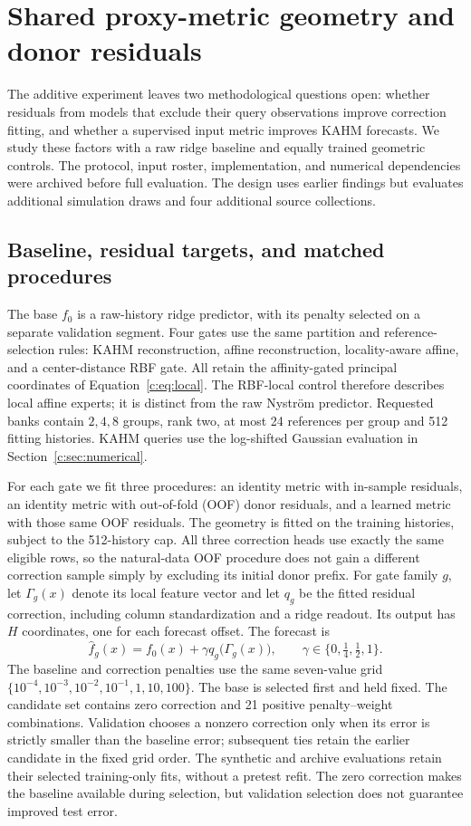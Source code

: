 \section{Shared proxy-metric geometry and donor residuals}
\label{sec:target-geometry}

The additive experiment leaves two methodological questions open: whether
residuals from models that exclude their query observations improve
correction fitting, and whether a supervised input metric improves KAHM
forecasts. We study these factors with a raw ridge baseline and equally
trained geometric controls. The protocol, input roster, implementation,
and numerical dependencies were archived before full evaluation. The
design uses earlier findings but evaluates additional simulation draws
and four additional source collections.

\subsection{Baseline, residual targets, and matched procedures}
\label{sec:target-procedures}

The base $f_0$ is a raw-history ridge predictor, with its penalty selected
on a separate validation segment. Four gates use the same partition and
reference-selection rules: KAHM reconstruction, affine reconstruction,
locality-aware affine, and a center-distance RBF gate. All retain the
affinity-gated principal coordinates of Equation~\eqref{c:eq:local}.
The RBF-local control therefore describes local affine experts; it is
distinct from the raw Nystr\"om predictor. Requested banks contain
$2,4,8$ groups, rank two, at most 24 references per group and 512 fitting
histories. KAHM queries use the log-shifted Gaussian evaluation in
Section~\ref{c:sec:numerical}.

For each gate we fit three procedures: an identity metric with in-sample
residuals, an identity metric with out-of-fold (OOF) donor residuals, and a
learned metric with those same OOF residuals. The geometry is fitted on the training histories, subject to the
512-history cap. All three correction heads use exactly the same eligible rows,
so the natural-data OOF procedure does not gain a different correction
sample simply by excluding its initial donor prefix. For gate family $g$, let $\Gamma_g(x)$ denote its local feature
vector and let $q_g$ be the fitted residual correction, including
column standardization and a ridge readout. Its output has $H$
coordinates, one for each forecast offset. The forecast is
\[
 \widehat f_g(x)=f_0(x)+\gamma q_g\bigl(\Gamma_g(x)\bigr),
 \qquad \gamma\in\{0,\tfrac14,\tfrac12,1\}.
\]
The baseline and correction penalties use the same seven-value grid
$\{10^{-4},10^{-3},10^{-2},10^{-1},1,10,100\}$. The base is selected
first and held fixed. The candidate set contains zero correction and 21 positive
penalty--weight combinations. Validation chooses a nonzero correction
only when its error is strictly smaller than the baseline error;
subsequent ties retain the earlier candidate in the fixed grid order. The synthetic and archive evaluations retain their selected training-only fits,
without a pretest refit. The zero correction makes the baseline available during selection,
but validation selection does not guarantee improved test error.

